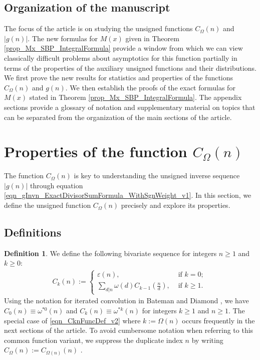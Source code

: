 \documentclass[11pt,reqno,a4letter]{article}
\newcommand{\hlocalref}[1]{\hyperref[#1]{\ref{#1}}}
\numberwithin{equation}{section}
\numberwithin{figure}{section}
\numberwithin{table}{section}
\newcommand{\seqnum}[1]{\href{http://oeis.org/#1}{\color{ProcessBlue}{\underline{#1}}}}
\theoremstyle{plain}
\numberwithin{theorem}{section}
\theoremstyle{definition}
\newtheorem{definition}[theorem]{Definition}
\begin{document}
\subsection{Organization of the manuscript}

The focus of the article is on studying the unsigned functions 
$C_{\Omega}(n)$ and $|g(n)|$. 
The new formulas for $M(x)$ given in 
Theorem \hlocalref{prop_Mx_SBP_IntegralFormula} 
provide a window from which we can view classically  
difficult problems about asymptotics for this function partially in terms of the 
properties of the auxiliary unsigned functions and their distributions. 
We first prove the new results for statistics and properties of the functions 
$C_{\Omega}(n)$ and $g(n)$. We then establish the proofs of the 
exact formulas for $M(x)$ stated in 
Theorem \hlocalref{prop_Mx_SBP_IntegralFormula}. 
The appendix sections provide a glossary of notation and 
supplementary material on topics that can be separated from the 
organization of the main sections of the article. 

\section{Properties of the function $C_{\Omega}(n)$} 
\label{Section_NewFormulasForgInvn_v1} 

The function $C_{\Omega}(n)$ is key to understanding the 
unsigned inverse sequence $|g(n)|$ through equation 
\eqref{eqn_gInvn_ExactDivisorSumFormula_WithSgnWeight_v1}. 
In this section, we define the unsigned function 
$C_{\Omega}(n)$ precisely and explore its properties. 

\subsection{Definitions}

\begin{definition}
We define the following bivariate sequence for integers $n \geq 1$ and $k \geq 0$: 
\begin{align} 
\label{eqn_CknFuncDef_v2} 
C_k(n) := \begin{cases} 
     \varepsilon(n), & \text{ if $k = 0$; } \\ 
     \sum\limits_{d|n} \omega(d) C_{k-1}\left(\frac{n}{d}\right), & \text{ if $k \geq 1$. } 
     \end{cases} 
\end{align} 
Using the notation for iterated convolution in 
Bateman and Diamond \cite[Def.~ 2.3; \S 2]{ANT-BATEMAN-DIAMOND}, we have 
$C_0(n) \equiv \omega^{\ast 0}(n)$ and $C_k(n) \equiv \omega^{\ast k}(n)$ for 
integers $k \geq 1$ and $n \geq 1$. 
The special case of \eqref{eqn_CknFuncDef_v2} where 
$k := \Omega(n)$ occurs frequently in the next sections of the 
article. To avoid cumbersome notation when referring to this common function variant, we suppress the 
duplicate index $n$ by writing $C_{\Omega}(n) := C_{\Omega(n)}(n)$ \cite[\seqnum{A008480}]{OEIS}. 
\end{definition}
\end{document}
